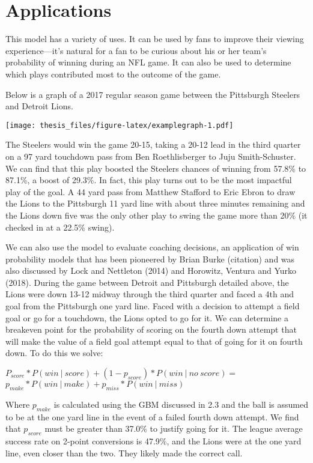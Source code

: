 \documentclass[12pt,twoside]{dukestatscithesis}
\begin{document}
\hypertarget{applications}{%
\chapter{Applications}\label{applications}}

This model has a variety of uses. It can be used by fans to improve their viewing experience---it's natural for a fan to be curious about his or her team's probability of winning during an NFL game. It can also be used to determine which plays contributed most to the outcome of the game.

Below is a graph of a 2017 regular season game between the Pittsburgh Steelers and Detroit Lions.

\texttt{[image: thesis\_files/figure-latex/examplegraph-1.pdf]}

The Steelers would win the game 20-15, taking a 20-12 lead in the third quarter on a 97 yard touchdown pass from Ben Roethlisberger to Juju Smith-Schuster. We can find that this play boosted the Steelers chances of winning from 57.8\% to 87.1\%, a boost of 29.3\%. In fact, this play turns out to be the most impactful play of the goal. A 44 yard pass from Matthew Stafford to Eric Ebron to draw the Lions to the Pittsburgh 11 yard line with about three minutes remaining and the Lions down five was the only other play to swing the game more than 20\% (it checked in at a 22.5\% swing).

We can also use the model to evaluate coaching decisions, an application of win probability models that has been pioneered by Brian Burke (citation) and was also discussed by Lock and Nettleton (2014) and Horowitz, Ventura and Yurko (2018). During the game between Detroit and Pittsburgh detailed above, the Lions were down 13-12 midway through the third quarter and faced a 4th and goal from the Pittsburgh one yard line. Faced with a decision to attempt a field goal or go for a touchdown, the Lions opted to go for it. We can determine a breakeven point for the probability of scoring on the fourth down attempt that will make the value of a field goal attempt equal to that of going for it on fourth down. To do this we solve:

\(P_{score}*P(win \:|\: score)+(1-p_{score})* P(win \:| \: no \: score) =\)\\
\(p_{make} * P(win \:| \:make) + p_{miss} * P(win \:| \:miss)\)

Where \(p_{make}\) is calculated using the GBM discussed in 2.3 and the ball is assumed to be at the one yard line in the event of a failed fourth down attempt. We find that \(p_{score}\) must be greater than 37.0\% to justify going for it. The league average success rate on 2-point conversions is 47.9\%, and the Lions were at the one yard line, even closer than the two. They likely made the correct call.
\end{document}
